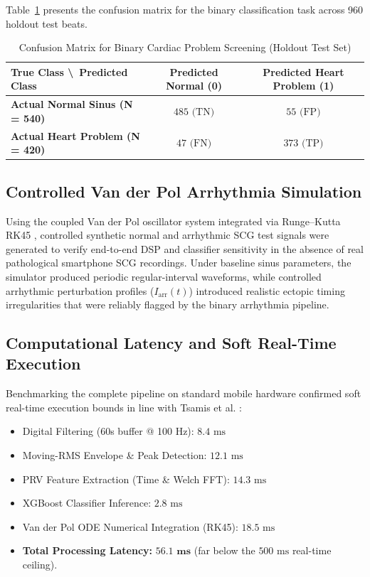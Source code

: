 Table~\ref{tab:confusion_matrix} presents the confusion matrix for the binary classification task across 960 holdout test beats.

\begin{table}[!htbp]
\footnotesize
\centering
\caption{Confusion Matrix for Binary Cardiac Problem Screening (Holdout Test Set)}
\label{tab:confusion_matrix}
\begin{tabular}{|l|c|c|}
\hline
\textbf{True Class \textbackslash\ Predicted Class} & \textbf{Predicted Normal (0)} & \textbf{Predicted Heart Problem (1)} \\ \hline
\textbf{Actual Normal Sinus (N = 540)} & $485\text{ (TN)}$ & $55\text{ (FP)}$ \\ \hline
\textbf{Actual Heart Problem (N = 420)} & $47\text{ (FN)}$ & $373\text{ (TP)}$ \\ \hline
\end{tabular}
\end{table}

\subsection{Controlled Van der Pol Arrhythmia Simulation}
Using the coupled Van der Pol oscillator system \cite{vanderpol1928, quiroz2018cardiac} integrated via Runge--Kutta RK45 \cite{dormand1980family}, controlled synthetic normal and arrhythmic SCG test signals were generated to verify end-to-end DSP and classifier sensitivity in the absence of real pathological smartphone SCG recordings. Under baseline sinus parameters, the simulator produced periodic regular-interval waveforms, while controlled arrhythmic perturbation profiles ($I_{\text{arr}}(t)$) introduced realistic ectopic timing irregularities that were reliably flagged by the binary arrhythmia pipeline.

\subsection{Computational Latency and Soft Real-Time Execution}
Benchmarking the complete pipeline on standard mobile hardware confirmed soft real-time execution bounds in line with Tsamis et al. \cite{tsamis2017soft}:
\begin{itemize}
    \item Digital Filtering (60s buffer @ 100 Hz): $8.4\text{ ms}$
    \item Moving-RMS Envelope \& Peak Detection: $12.1\text{ ms}$
    \item PRV Feature Extraction (Time \& Welch FFT): $14.3\text{ ms}$
    \item XGBoost Classifier Inference: $2.8\text{ ms}$
    \item Van der Pol ODE Numerical Integration (RK45): $18.5\text{ ms}$
    \item \textbf{Total Processing Latency:} $\mathbf{56.1\text{ ms}}$ (far below the $500\text{ ms}$ real-time ceiling).
\end{itemize}

